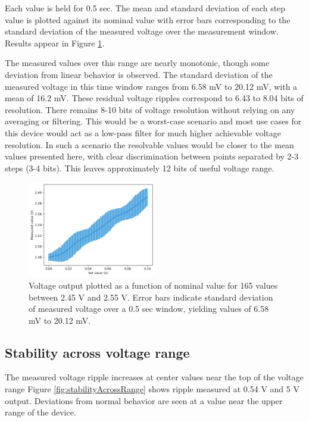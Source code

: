 \documentclass[10pt,a4paper]{article}
\begin{document}
Each value is held for 0.5 sec.  The mean and standard deviation of each step value is plotted against its nominal value with error bars corresponding to the standard deviation of the measured voltage over the measurement window.  Results appear in Figure \ref{fig:stepResolution}.  

The measured values over this range are nearly monotonic, though some deviation from linear behavior is observed.  The standard deviation of the measured voltage in this time window ranges from 6.58 mV to 20.12 mV, with a mean of 16.2 mV.  These residual voltage ripples correspond to 6.43 to 8.04 bits of resolution. There remains 8-10 bits of voltage resolution without relying on any averaging or filtering.  This would be a worst-case scenario and most use cases for this device would act as a low-pass filter for much higher achievable voltage resolution. In such a scenario the resolvable values would be closer to the mean values presented here, with clear discrimination between points separated by 2-3 steps (3-4 bits).  This leaves approximately 12 bits of useful voltage range.  

\begin{figure}
	\centering
	\includegraphics[width=0.5\textwidth]{../output/stepResolutionSummary.png}
	\caption[stepResolution]{Voltage output plotted as a function of nominal value for 165 values between 2.45 V and 2.55 V.  Error bars indicate standard deviation of measured voltage over a 0.5 sec window, yielding values of 6.58 mV to 20.12 mV.\newline}
	\label{fig:stepResolution}
\end{figure} 

\subsection{Stability across voltage range}

The measured voltage ripple increases at center values near the top of the voltage range  Figure \ref{fig:stabilityAcrossRange} shows ripple measured at 0.54 V and 5 V output.  Deviations from normal behavior are seen at a value near the upper range of the device. 
\end{document}
